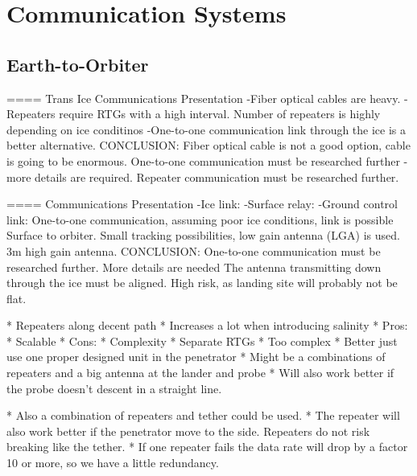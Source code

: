 \chapter{Communication Systems}



\section{Earth-to-Orbiter}







	





==== Trans Ice Communications Presentation
    -Fiber optical cables are heavy.
    -Repeaters require RTGs with a high interval. Number of repeaters is highly depending on ice conditinos
    -One-to-one communication link through the ice is a better alternative.
CONCLUSION: Fiber optical cable is not a good option, cable is going to be enormous.
            One-to-one communication must be researched further - more details are required.
            Repeater communication must be researched further.
            
==== Communications Presentation
-Ice link:
-Surface relay:
-Ground control link:
One-to-one communication, assuming poor ice conditions, link is possible
Surface to orbiter. Small tracking possibilities, low gain antenna (LGA) is used.
3m high gain antenna.
CONCLUSION: One-to-one communication must be researched further. More details are needed
            The antenna transmitting down through the ice must be aligned. High risk, as landing site will probably not be flat.

* Repeaters along decent path
	* Increases a lot when introducing salinity
	* Pros:
		* Scalable
	* Cons:
		* Complexity
		* Separate RTGs
	* Too complex
		* Better just use one proper designed unit in the penetrator
		* Might be a combinations of repeaters and a big antenna at the lander and probe
		* Will also work better if the probe doesn't descent in a straight line.

	* Also a combination of repeaters and tether could be used.
	* The repeater will also work better if the penetrator move to the side. Repeaters do not risk breaking like the tether.
	* If one repeater fails the data rate will drop by a factor 10 or more, so we have a little redundancy.
